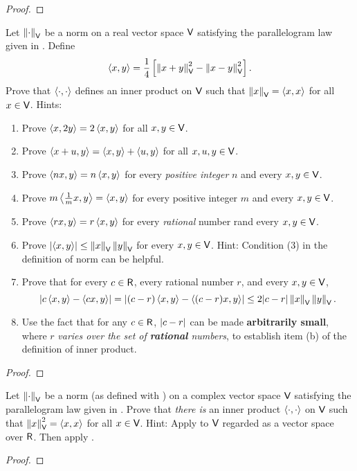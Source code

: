 \begin{proof}
\end{proof}

\begin{exercise} \label{exercise 6.1.29}
Let \(\left\lVert \cdot \right\rVert_{\textsf{V}}\) be a norm on a real vector space \(\textsf{V}\) satisfying the parallelogram law given in .
Define
\[
    \left< x, y \right> = \frac{1}{4} \left[ \left\lVert x + y\right\rVert_{\textsf{V}}^2 - \left\lVert x - y\right\rVert_{\textsf{V}}^2 \right].
\]
Prove that \(\left< \cdot, \cdot \right>\) defines an inner product on \(\textsf{V}\) such that \(\left\lVert x\right\rVert_{\textsf{V}} = \left< x, x \right>\) for all \(x \in \textsf{V}\).
Hints:
\begin{enumerate}
\item Prove \(\left< x, 2y \right> = 2 \left< x, y \right>\) for all \(x, y \in \textsf{V}\).
\item Prove \(\left< x + u, y \right> = \left< x, y \right> + \left< u, y \right>\) for all \(x, u, y \in \textsf{V}\).
\item Prove \(\left< nx, y \right> = n \left< x, y \right>\) for every \emph{positive integer} \(n\) and every \(x, y \in \textsf{V}\).
\item Prove \(m \left< \frac{1}{m} x, y \right> = \left< x, y \right>\) for every positive integer \(m\) and every \(x, y \in \textsf{V}\).
\item Prove \(\left< rx, y \right> = r \left< x, y \right>\) for every \emph{rational} number rand every \(x, y \in \textsf{V}\).
\item Prove \(\lvert \left< x, y \right> \rvert \le \left\lVert x\right\rVert_{\textsf{V}} \left\lVert y\right\rVert_{\textsf{V}}\) for every \(x, y \in \textsf{V}\).
Hint: Condition (3) in the definition of norm can be helpful.
\item Prove that for every \(c \in \textsf{R}\), every rational number \(r\), and every \(x, y \in \textsf{V}\),
\[
    \lvert c \left< x, y \right> - \left< cx, y \right> \rvert = \lvert (c - r) \left< x, y \right> - \left<(c - r)x, y \right>\rvert \le 2\lvert c - r\rvert \left\lVert x\right\rVert_{\textsf{V}} \left\lVert y\right\rVert_{\textsf{V}}.
\]
\item Use the fact that for any \(c \in \textsf{R}\), \(\lvert c - r\rvert\) can be made \textbf{arbitrarily small}, where \(r\) \emph{varies over the set of \textbf{rational} numbers}, to establish item (b) of the definition of inner product.
\end{enumerate}
\end{exercise}

\begin{proof}
\end{proof}

\begin{exercise} \label{exercise 6.1.30}
Let \(\left\lVert\cdot\right\rVert_{\textsf{V}}\) be a norm (as defined with ) on a complex vector space \(\textsf{V}\) satisfying the parallelogram law given in .
Prove that \emph{there is} an inner product \(\left< \cdot, \cdot \right>\) on \(\textsf{V}\) such that \(\left\lVert x\right\rVert_{\textsf{V}}^2 = \left< x, x \right>\) for all \(x \in \textsf{V}\).
Hint: Apply  to \(\textsf{V}\) regarded as a vector space over \(\textsf{R}\).
Then apply .
\end{exercise}
\begin{proof}
\end{proof}
